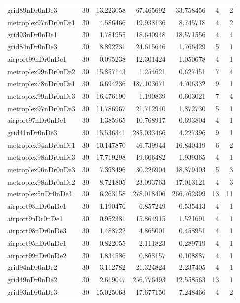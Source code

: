 \begin{longtable}{|l|r|r|r|r|r|r|}
grid89nDr0nDe3 & 30 & 13.223058 & 67.465692 & 33.758456 & 4 & 2 \\
metroplex97nDr0nDe1 & 30 & 4.586466 & 19.938136 & 8.745718 & 4 & 2 \\
grid93nDr0nDe1 & 30 & 1.781955 & 18.640948 & 18.571556 & 4 & 4 \\
grid84nDr0nDe3 & 30 & 8.892231 & 24.615646 & 1.766429 & 5 & 1 \\
airport99nDr0nDe1 & 30 & 0.095238 & 12.301424 & 1.050678 & 4 & 1 \\
metroplex99nDr0nDe2 & 30 & 15.857143 & 1.254621 & 0.627451 & 7 & 4 \\
metroplex78nDr0nDe1 & 30 & 6.694236 & 187.103671 & 4.706332 & 9 & 1 \\
metroplex99nDr0nDe3 & 30 & 16.476190 & 1.190839 & 0.603021 & 7 & 4 \\
metroplex97nDr0nDe3 & 30 & 11.786967 & 21.712940 & 1.872730 & 5 & 1 \\
airport97nDr0nDe1 & 30 & 1.385965 & 10.768917 & 0.693804 & 4 & 1 \\
grid41nDr0nDe3 & 30 & 15.536341 & 285.033466 & 4.227396 & 9 & 1 \\
metroplex94nDr0nDe1 & 30 & 10.147870 & 46.739944 & 16.840419 & 6 & 2 \\
metroplex98nDr0nDe3 & 30 & 17.719298 & 19.606482 & 1.939365 & 4 & 1 \\
metroplex96nDr0nDe3 & 30 & 7.398496 & 30.226904 & 18.879403 & 5 & 3 \\
metroplex98nDr0nDe2 & 30 & 8.721805 & 23.093763 & 17.013121 & 4 & 3 \\
metroplex5nDr0nDe3 & 30 & 6.263158 & 278.018406 & 266.762399 & 13 & 11 \\
airport98nDr0nDe1 & 30 & 1.190476 & 6.857249 & 0.535413 & 4 & 1 \\
airport9nDr0nDe1 & 30 & 0.952381 & 15.864915 & 1.521691 & 4 & 1 \\
airport98nDr0nDe3 & 30 & 1.488722 & 4.865001 & 0.458951 & 4 & 1 \\
airport95nDr0nDe1 & 30 & 0.822055 & 2.111823 & 0.289719 & 4 & 1 \\
airport99nDr0nDe2 & 30 & 1.834586 & 0.868157 & 0.108887 & 4 & 1 \\
grid94nDr0nDe2 & 30 & 3.112782 & 21.324824 & 2.237405 & 4 & 1 \\
grid49nDr0nDe2 & 30 & 2.619047 & 256.776493 & 12.558563 & 13 & 1 \\
grid93nDr0nDe3 & 30 & 15.025063 & 17.677150 & 7.248466 & 4 & 2 \\

\end{longtable}
